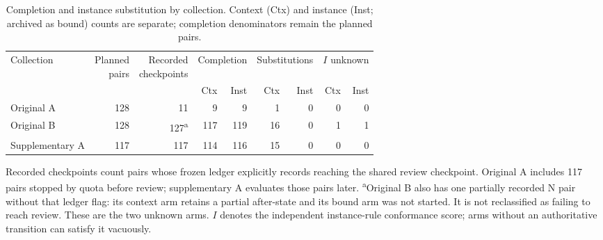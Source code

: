 \begin{table}[tbp]
\caption{Completion and instance substitution by collection. Context (Ctx) and instance (Inst; archived as bound) counts are separate; completion denominators remain the planned pairs.}\label{tab:outcomes}
\centering\small
\setlength{\tabcolsep}{2pt}
\begin{tabular*}{\textwidth}{@{\extracolsep{\fill}}lrrrrrrrr@{}}
\toprule
Collection & \shortstack{Planned\\pairs} & \shortstack{Recorded\\checkpoints} & \multicolumn{2}{c}{Completion} & \multicolumn{2}{c}{Substitutions} & \multicolumn{2}{c}{$I$ unknown} \\
\cmidrule(lr){4-5}\cmidrule(lr){6-7}\cmidrule(lr){8-9}
 & & & Ctx & Inst & Ctx & Inst & Ctx & Inst \\
\midrule
Original A & 128 & 11 & 9 & 9 & 1 & 0 & 0 & 0 \\
Original B & 128 & 127\textsuperscript{a} & 117 & 119 & 16 & 0 & 1 & 1 \\
Supplementary A & 117 & 117 & 114 & 116 & 15 & 0 & 0 & 0 \\
\bottomrule
\end{tabular*}
\par\smallskip\begin{minipage}{\textwidth}\small Recorded checkpoints count pairs whose frozen ledger explicitly records reaching the shared review checkpoint. Original A includes 117 pairs stopped by quota before review; supplementary A evaluates those pairs later. \textsuperscript{a}Original B also has one partially recorded N pair without that ledger flag: its context arm retains a partial after-state and its bound arm was not started. It is not reclassified as failing to reach review. These are the two unknown arms. $I$ denotes the independent instance-rule conformance score; arms without an authoritative transition can satisfy it vacuously.\end{minipage}
\end{table}
